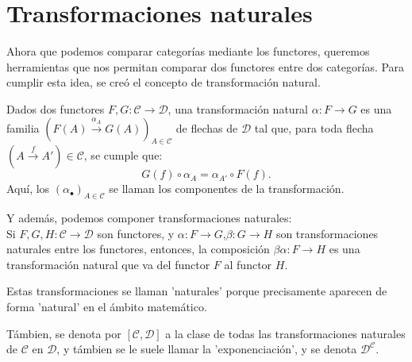 \section{Transformaciones naturales}
    Ahora que podemos comparar categorías mediante los functores, queremos herramientas que nos permitan comparar dos functores entre dos categorías. Para cumplir esta idea, se creó el concepto de transformación natural.
    \begin{defn}
        Dados dos functores $F,G:\mathcal{C\to D}$, una transformación natural $\alpha:F\to G$ es una familia $(F(A)\overset{\alpha_A}{\to}G(A))_{A\in\mathcal{C}}$ de flechas de $\mathcal{D}$ tal que, para toda flecha $(A\overset{f}{\to}A')\in\mathcal{C}$, se cumple que:
        \begin{equation*}
            G(f)\circ\alpha_A = \alpha_{A'}\circ F(f).
        \end{equation*}
        Aquí, los $(\alpha_\bullet)_{A\in\mathcal{C}}$ se llaman los componentes de la transformación.
    \end{defn}
    Y además, podemos componer transformaciones naturales:\\
    Si $F,G,H:\mathcal{C\to D}$ son functores, y $\alpha:F\to G$,$\beta:G\to H$ son transformaciones naturales entre los functores, entonces, la composición $\beta\alpha:F\to H$ es una transformación natural que va del functor $F$ al functor $H$.
    
    Estas transformaciones se llaman 'naturales' porque precisamente aparecen de forma 'natural' en el ámbito matemático.
    
    Támbien, se denota por $[\mathcal{C,D}]$ a la clase de todas las transformaciones naturales de $\mathcal{C}$ en $\mathcal{D}$, y támbien se le suele llamar la 'exponenciación', y se denota $\mathcal{D^C}$.
    
